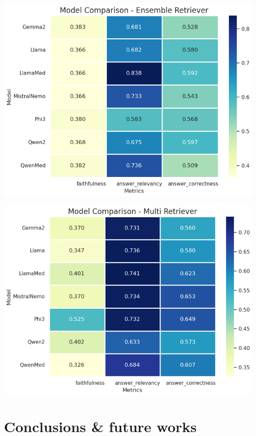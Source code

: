 \documentclass[handout]{beamer}\mode<handout>{\usetheme{AMSBolognaFC}}
\begin{document}
\begin{frame}[allowframebreaks]
    \framebreak

    \vfill
    \centering
    \includegraphics[height=0.8\textheight]{figures/ensembleretriever}

    \framebreak

    \vfill
    \centering
    \includegraphics[height=0.8\textheight]{figures/multiretriever}

\end{frame}


\section{Conclusions \& future works}
\end{document}
